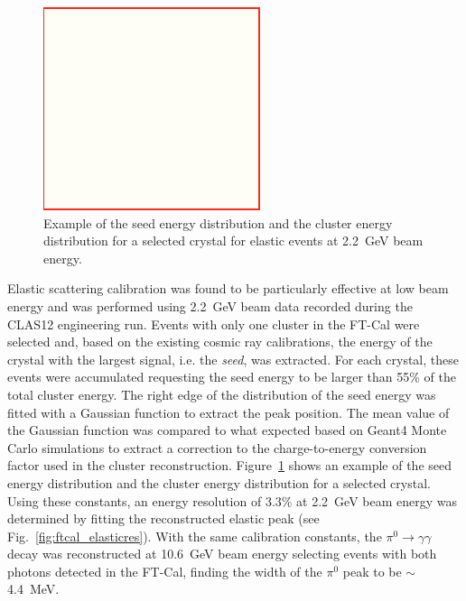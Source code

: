 \begin{figure}
\includegraphics[height=1.0\columnwidth]{fig/dummy.png}
\caption{Example of the seed energy distribution and the cluster energy distribution for a selected crystal for
  elastic events at 2.2~GeV beam energy.}
\label{fig:ftcal_elasticcal}
\end{figure}

Elastic scattering calibration was found to be particularly effective at low beam energy and was performed using
2.2~GeV beam data recorded during the CLAS12 engineering run. Events with only one cluster in the FT-Cal were
selected and, based on the existing cosmic ray calibrations, the energy of the crystal with the largest signal, i.e. the
{\it seed}, was extracted. For each crystal, these events were accumulated requesting the seed energy to be larger
than 55\% of the total cluster energy. The right edge of the distribution of the seed energy was fitted with a
Gaussian function to extract the peak position. The mean value of the Gaussian function was compared to what
expected based on Geant4 Monte Carlo simulations to extract a correction to the charge-to-energy conversion factor
used in the cluster reconstruction. Figure~\ref{fig:ftcal_elasticcal} shows an example of the seed energy distribution
and the cluster energy distribution for a selected crystal. Using these constants, an energy resolution of 3.3\% at
2.2~GeV beam energy was determined by fitting the reconstructed elastic peak (see Fig.~\ref{fig:ftcal_elasticres}).
With the same calibration constants, the $\pi^0\to\gamma\gamma$ decay was reconstructed at 10.6~GeV beam
energy selecting events with both photons detected in the FT-Cal, finding the width of the $\pi^0$ peak to be
$\sim$4.4~MeV.

